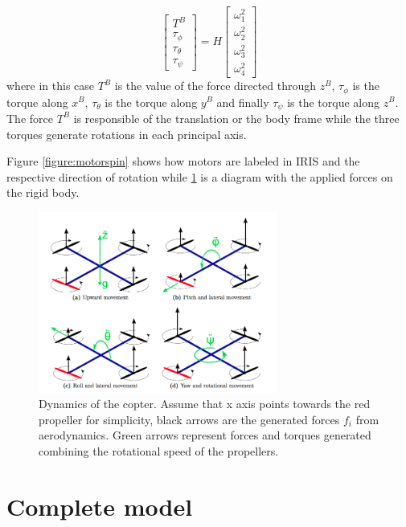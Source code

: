 \begin{equation}
\begin{bmatrix}
T^B\\\tau_\phi\\\tau_\theta\\\tau_\psi
\end{bmatrix} = H \begin{bmatrix}
\omega_1^2\\\omega_2^2\\\omega_3^2\\\omega_4^2
\end{bmatrix}
\label{eq:inputmixmatrix}
\end{equation}
where in this case $T^B$ is the value of the force directed through $z^B$, $\tau_\phi$ is the torque along $x^B$, $\tau_\theta$ is the torque along $y^B$ and finally  $\tau_\psi$ is the torque along $z^B$. The force $T^B$ is responsible of the translation or the body frame while the three torques generate rotations in each principal axis.

Figure \ref{figure:motorspin} shows how motors are labeled in IRIS and the respective direction of rotation while \ref{figure:forces} is a diagram with the applied forces on the rigid body.

\begin{figure}[h]
\centering
 \includegraphics[width=0.7\textwidth]{forces.png}
 \caption[Quad dynamics]{Dynamics of the copter. Assume that x axis points towards the red propeller for simplicity, black arrows are the generated forces $f_i$ from aerodynamics. Green arrows represent forces and torques generated combining the rotational speed of the propellers.}
 \label{figure:forces}
\end{figure}


\section{Complete model}


